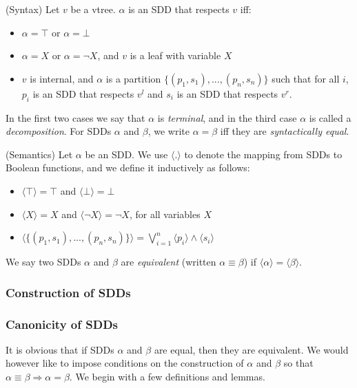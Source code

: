 \documentclass[12]{article}
\newenvironment{definition}[1][Definition]{\begin{trivlist}
\item[\hskip \labelsep {\bfseries #1}]}{\end{trivlist}}
\begin{document}
\begin{definition} (Syntax)
Let $v$ be a vtree. $\alpha$ is an SDD that respects $v$ iff: 
\begin{itemize} 
\item $\alpha = \top$ or $\alpha = \bot$
\item $\alpha = X$ or $\alpha = \lnot X$, and $v$ is a leaf with variable $X$
\item $v$ is internal, and $\alpha$ is a partition  $\{(p_1, s_1), ..., (p_n, s_n)\}$ such that for all $i$, $p_i$ is an SDD that respects $v^l$ and $s_i$ is an SDD that respects $v^r$.
\end{itemize}
In the first two cases we say that $\alpha$ is \textit{terminal}, and in the third case $\alpha$ is called a \textit{decomposition}. For SDDs $\alpha$ and $\beta$, we write $\alpha = \beta$ iff they are \textit{syntactically equal}.
\end{definition}

\begin{definition} (Semantics)
Let $\alpha$ be an SDD. We use $\langle . \rangle$ to denote the mapping from SDDs to Boolean functions, and we define it inductively as follows: 
\begin{itemize} 
\item $\langle \top \rangle = \top$ and  $\langle \bot \rangle = \bot$
\item $\langle X \rangle = X$ and $\langle \lnot X \rangle = \lnot X$, for all variables $X$
\item $\langle\{(p_1, s_1), ..., (p_n, s_n)\}\rangle = \bigvee_{i = 1}^n \langle p_i \rangle \land \langle s_i \rangle  $
\end{itemize}
We say two SDDs $\alpha$ and $\beta$ are \textit{equivalent} (written $\alpha \equiv \beta$) if $\langle \alpha \rangle = \langle \beta \rangle$.

\end{definition}


\subsubsection{Construction of SDDs}



\subsubsection{Canonicity of SDDs} 

It is obvious that if SDDs $\alpha$ and $\beta$ are equal, then they are equivalent. We would however like 
to impose conditions on the construction of $\alpha$ and $\beta$  so that $\alpha \equiv \beta \Rightarrow \alpha = \beta$.
We begin with a few definitions and lemmas.
\end{document}
